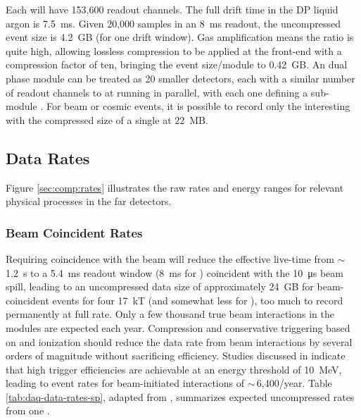 

Each  will have 153,600 readout channels. The full drift time in the DP liquid argon is \SI{7.5}{ms}. Given 20,000 samples in an \SI{8}{ms} readout, the uncompressed event size is \SI{4.2}{GB} (for one drift window).  Gas amplification means the  ratio is quite high, allowing lossless compression to be applied at the front-end  with a compression factor of ten, bringing the event size/module to \SI{.42}{GB}.
An   dual phase module can be treated as 20 smaller  detectors, each with a similar number  of readout channels to   %
at  running in parallel,  with each one defining a sub-module . For beam or cosmic events, it is possible to record only the interesting  with the compressed size of a single  at \SI{22}{MB}.

\subsection{Data Rates}
Figure \ref{sec:comp:rates} illustrates the raw rates and energy ranges for relevant physical processes in the far detectors. 

\subsubsection{Beam Coincident Rates}


Requiring  coincidence with the  beam will reduce the effective live-time from $\sim\,$\SI{1.2}{s}  to a \SI{5.4}{ms}  readout window (\SI{8}{ms} for ) coincident with the \SI{10}{\micro\second} beam spill, leading to an uncompressed data size of approximately \SI{24}{GB} for beam-coincident events for four \SI{17}{kT}  (and somewhat less for ), too much to record permanently at full rate.
Only a few thousand true beam interactions in the  modules are expected each year.  Compression and conservative triggering based on  and ionization should reduce the data rate from beam interactions by several orders of magnitude without sacrificing efficiency.  Studies discussed in %
\spchdaq{} 
indicate that high trigger efficiencies are achievable at an energy threshold of \SI{10}{MeV}, leading to event rates for beam-initiated  interactions of $\sim\,$6,400/year.
Table \ref{tab:daq-data-rates-sp}, adapted from \spchdaq{}, %
 summarizes expected uncompressed rates from one . 

